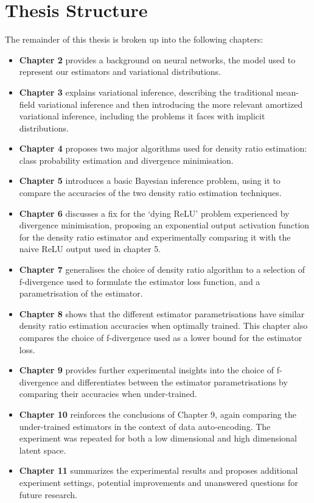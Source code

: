 \documentclass[honours,12pt]{unswthesis}
\numberwithin{equation}{section}
\theoremstyle{definition}
\begin{document}
\section{Thesis Structure}
The remainder of this thesis is broken up into the following chapters:
\begin{itemize}
\item \textbf{Chapter 2} provides a background on neural networks, the model used to represent our estimators and variational distributions.
\item \textbf{Chapter 3} explains variational inference, describing the traditional mean-field variational inference and then introducing the more relevant amortized variational inference, including the problems it faces with implicit distributions.
\item \textbf{Chapter 4} proposes two major algorithms used for density ratio estimation: class probability estimation and divergence minimisation.
\item \textbf{Chapter 5} introduces a basic Bayesian inference problem, using it to compare the accuracies of the two density ratio estimation techniques.
\item \textbf{Chapter 6} discusses a fix for the `dying ReLU' problem experienced by divergence minimisation, proposing an exponential output activation function for the density ratio estimator and experimentally comparing it with the naive ReLU output used in chapter 5.
\item \textbf{Chapter 7} generalises the choice of density ratio algorithm to a selection of f-divergence used to formulate the estimator loss function, and a parametrisation of the estimator.
\item \textbf{Chapter 8} shows that the different estimator parametrisations have similar density ratio estimation accuracies when optimally trained. This chapter also compares the choice of f-divergence used as a lower bound for the estimator loss.
\item \textbf{Chapter 9} provides further experimental insights into the choice of f-divergence and differentiates between the estimator parametrisations by comparing their accuracies when under-trained.
\item \textbf{Chapter 10} reinforces the conclusions of Chapter 9, again comparing the under-trained estimators in the context of data auto-encoding. The experiment was repeated for both a low dimensional and high dimensional latent space.
\item \textbf{Chapter 11} summarizes the experimental results and proposes additional experiment settings, potential improvements and unanswered questions for future research.
\end{itemize}
\end{document}
